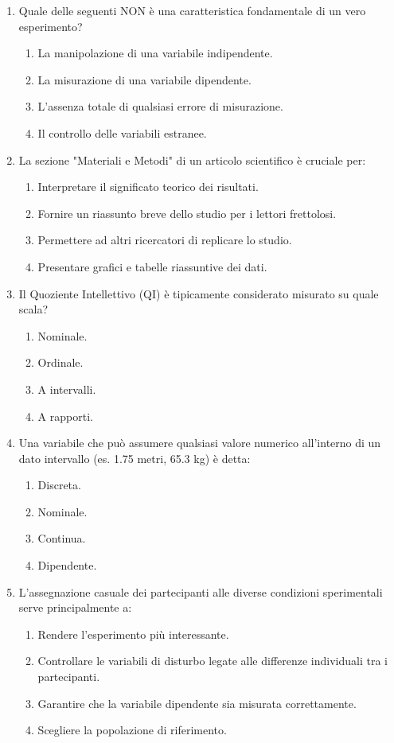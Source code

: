 \documentclass[12pt, a4paper]{article}
\begin{document}
\begin{enumerate}
     \item Quale delle seguenti NON è una caratteristica fondamentale di un vero esperimento?
    \begin{enumerate}
        \item La manipolazione di una variabile indipendente.
        \item La misurazione di una variabile dipendente.
        \item L'assenza totale di qualsiasi errore di misurazione.
        \item Il controllo delle variabili estranee.
    \end{enumerate}

    \item La sezione "Materiali e Metodi" di un articolo scientifico è cruciale per:
    \begin{enumerate}
        \item Interpretare il significato teorico dei risultati.
        \item Fornire un riassunto breve dello studio per i lettori frettolosi.
        \item Permettere ad altri ricercatori di replicare lo studio.
        \item Presentare grafici e tabelle riassuntive dei dati.
    \end{enumerate}

    \item Il Quoziente Intellettivo (QI) è tipicamente considerato misurato su quale scala?
    \begin{enumerate}
        \item Nominale.
        \item Ordinale.
        \item A intervalli.
        \item A rapporti.
    \end{enumerate}

    \item Una variabile che può assumere qualsiasi valore numerico all'interno di un dato intervallo (es. 1.75 metri, 65.3 kg) è detta:
    \begin{enumerate}
        \item Discreta.
        \item Nominale.
        \item Continua.
        \item Dipendente.
    \end{enumerate}

    \item L'assegnazione casuale dei partecipanti alle diverse condizioni sperimentali serve principalmente a:
    \begin{enumerate}
        \item Rendere l'esperimento più interessante.
        \item Controllare le variabili di disturbo legate alle differenze individuali tra i partecipanti.
        \item Garantire che la variabile dipendente sia misurata correttamente.
        \item Scegliere la popolazione di riferimento.
    \end{enumerate}


\end{enumerate}
\end{document}
